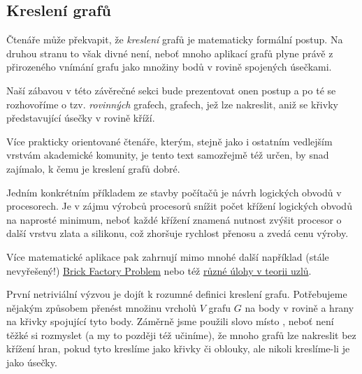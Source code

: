 \subsection{Kreslení grafů}
\label{ssec:kresleni-grafu}

Čtenáře může překvapit, že \emph{kreslení} grafů je matematicky formální postup.
Na druhou stranu to však divné není, neboť mnoho aplikací grafů plyne právě z
přirozeného vnímání grafu jako množiny bodů v rovině spojených úsečkami.

Naší zábavou v této závěrečné sekci bude prezentovat onen postup a po té se
rozhovoříme o tzv. \emph{rovinných} grafech, grafech, jež lze nakreslit, aniž se
křivky představující úsečky v rovině kříží.

Více prakticky orientované čtenáře, kterým, stejně jako i ostatním vedlejším
vrstvám akademické komunity, je tento text samozřejmě též určen, by snad
zajímalo, k čemu je kreslení grafů dobré.

Jedním konkrétním příkladem ze stavby počítačů je návrh logických obvodů v
procesorech. Je v zájmu výrobců procesorů snížit počet křížení logických obvodů
na naprosté minimum, neboť každé křížení znamená nutnost zvýšit procesor o další
vrstvu zlata a silikonu, což zhoršuje rychlost přenosu a zvedá cenu výroby.

Více matematické aplikace pak zahrnují mimo mnohé další například (stá\-le
nevyřešený!)
\href{https://en.wikipedia.org/wiki/Tur%C3%A1n%27s_brick_factory_problem}{Brick
Factory Problem} nebo též
\href{https://www.sciencedirect.com/science/article/abs/pii/S0252960212600472}{různé
úlohy v teorii uzlů}.

První netriviální výzvou je dojít k rozumné definici kreslení grafu. Potřebujeme
nějakým způsobem přenést množinu vrcholů $V$ grafu $G$ na body v rovině a hrany
na křivky spojující tyto body. Záměrně jsme použili slovo  místo
, neboť není těžké si rozmyslet (a my to později též učiníme), že
mnoho grafů lze nakreslit bez křížení hran, pokud tyto kreslíme jako křivky či
oblouky, ale nikoli kreslíme-li je jako úsečky.


